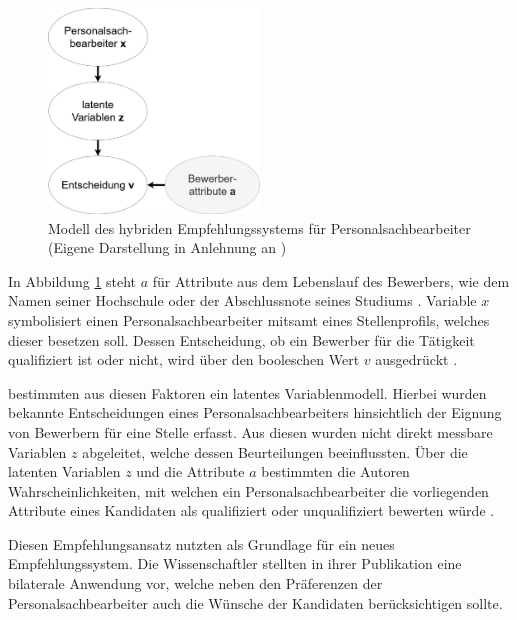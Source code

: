 \begin{figure}[h]
	\centering
	\includegraphics[width=0.5\textwidth]{gfx/faerber.jpg}
	\caption[Modell des hybriden Empfehlungssystems für Personalsachbearbeiter]{Modell des hybriden Empfehlungssystems für Personalsachbearbeiter\\
	(Eigene Darstellung in Anlehnung an \cite[S. 8]{faerber:2003})}
	\label{fig:verwandteArbeiten:abb1}
\end{figure}

In Abbildung \ref{fig:verwandteArbeiten:abb1} steht $a$ für Attribute aus dem Lebenslauf des Bewerbers, wie dem Namen seiner Hochschule oder der Abschlussnote seines Studiums \cite[S. 4]{malinowski:2006}. Variable $x$ symbolisiert einen Personalsachbearbeiter mitsamt eines Stellenprofils, welches dieser besetzen soll. Dessen Entscheidung, ob ein Bewerber für die Tätigkeit qualifiziert ist oder nicht, wird über den booleschen Wert $v$ ausgedrückt \cite[S. 6ff.]{faerber:2003}.

\textcite[S. 4ff.]{faerber:2003} bestimmten aus diesen Faktoren ein latentes Variablenmodell. Hierbei wurden bekannte Entscheidungen eines Personalsachbearbeiters hinsichtlich der Eignung von Bewerbern für eine Stelle erfasst. Aus diesen wurden nicht direkt messbare Variablen $z$ abgeleitet, welche dessen Beurteilungen beeinflussten. Über die latenten Variablen $z$ und die Attribute $a$ bestimmten die Autoren Wahrscheinlichkeiten, mit welchen ein Personalsachbearbeiter die vorliegenden Attribute eines Kandidaten als qualifiziert oder unqualifiziert bewerten würde \cite[S. 4ff.]{faerber:2003}.

Diesen Empfehlungsansatz nutzten \textcite[S. 4f.]{malinowski:2006} als Grundlage für ein neues Empfehlungssystem. Die Wissenschaftler stellten in ihrer Publikation eine bilaterale Anwendung vor, welche neben den Präferenzen der Personalsachbearbeiter auch die Wünsche der Kandidaten berücksichtigen sollte.

